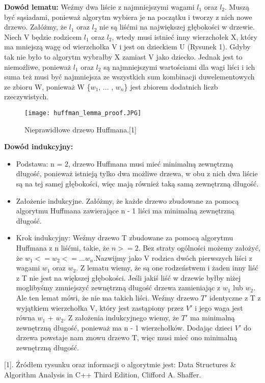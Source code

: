 \documentclass[a4paper,10pt]{article}
\begin{document}
\textbf{Dowód lematu:} \newline
Weźmy dwa liście z najmniejszymi wagami $l_1$ oraz $l_2$. Muszą być sąsiadami, ponieważ algorytm wybiera je na początku i tworzy z nich nowe drzewo. Załóżmy, że $l_1$ oraz $l_2$ nie są liśćmi na największej głębokości w drzewie. Niech  V będzie rodzicem $l_1$ oraz $l_2$, wtedy musi istnieć inny wierzchołek X, który ma mniejszą wagę od wierzchołka V i jest on dzieckiem U  (Rysunek 1). Gdyby tak nie było to algorytm wybrałby X zamiast V jako dziecko. Jednak jest to niemożliwe, ponieważ $l_1$ oraz $l_2$ są najmniejszymi wartościami dla wagi liści i ich suma też musi być najmniejsza ze wszystkich sum kombinacji duwelementowych ze zbioru W, ponieważ  W \{$w_1$, ... , $w_n$\} jest zbiorem dodatnich liczb rzeczywistych. \newline \newline

\begin {figure}
    \texttt{[image: huffman\_lemma\_proof.JPG]}
    \caption{Nieprawidłowe drzewo Huffmana.[1]}
\end {figure}

\textbf{Dowód indukcyjny:} \newline
\begin{itemize}
	\item Podstawa: n = 2, drzewo Huffmana musi mieć minimalną zewnętrzną długość, ponieważ istnieją tylko dwa możliwe drzewa, w obu z nich dwa liście są na tej samej głębokości, więc mają również taką samą zewnętrzną długość. \newline
	\item Założenie indukcyjne. \newline
Załóżmy, że każde drzewo zbudowane za pomocą algorytmu Huffmana zawierające n - 1 liści ma minimalną zewnętrzną długość. \newline
\item Krok indukcyjny: \newline
Weźmy drzewo T zbudowane za pomocą algorytmu Huffmana z n liśćmi, takie, że $n>=2$. \newline Bez straty ogólności możemy założyć, że $w_1 <=  w_2 <= ... w_n$.\newline  Nazwijmy jako V rodzica dwóch pierwszych liści z wagami $w_1$ oraz $w_2$. Z lematu wiemy, że są one rodzeństwem i żaden inny liść z T nie jest na większej głębokości. Jeśli jakiś liść w drzewie byłby niżej moglibyśmy zmniejszyć zewnętrzną długość drzewa  zamieniając z $w_1$ lub $w_2$. Ale ten lemat mówi, że nie ma takich liści. \newline Weźmy drzewo $T'$ identyczne z T z wyjątkiem wierzchołka V, który jest zastąpiony przez $V'$ i jego waga jest równa $w_1$ + $w_2$. Z założenia indukcyjnego wiemy, że $T'$ ma minimalną zewnętrzną długość, ponieważ ma n - 1 wierzchołków. Dodając dzieci $V'$ do drzewa powstaje nam znowu drzewo T, więc musi mieć ono minimalną zewnętrzną długość. 
\end{itemize}
\begin{flushright}
\qedsymbol 
\end{flushright}

[1]. Źródłem rysunku oraz informacji o algorytmie jest: \newline Data Structures \& Algorithm Analysis in C++ Third Edition, \newline Clifford A. Shaffer.
\end{document}
